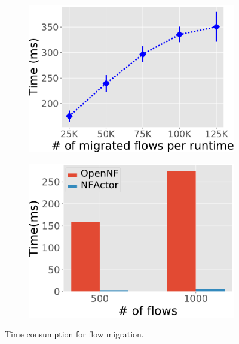  \begin{figure}[!t]
	\begin{subfigure}[t]{0.49\linewidth}
		\centering
		\includegraphics[width=\columnwidth]{figure/Migration.pdf}
		\caption{}\label{fig:tot-mig} \end{subfigure}\hfill
	 \begin{subfigure}[t]{0.49\linewidth}
		\centering
		\includegraphics[width=\columnwidth]{figure/Compare.pdf}
		\caption{}\label{fig:compare-opennf}
	 \end{subfigure}
\caption{ Time consumption for flow migration.} %
\label{fig:mig-perf}
\end{figure}

